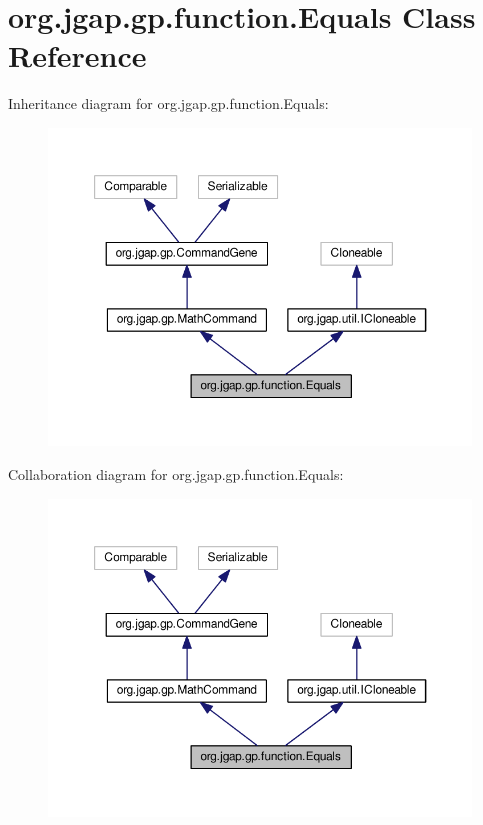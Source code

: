 \hypertarget{classorg_1_1jgap_1_1gp_1_1function_1_1_equals}{\section{org.\-jgap.\-gp.\-function.\-Equals Class Reference}
\label{classorg_1_1jgap_1_1gp_1_1function_1_1_equals}
}


Inheritance diagram for org.\-jgap.\-gp.\-function.\-Equals\-:
\nopagebreak
\begin{figure}[H]
\begin{center}
\leavevmode
\includegraphics[width=350pt]{classorg_1_1jgap_1_1gp_1_1function_1_1_equals__inherit__graph}
\end{center}
\end{figure}


Collaboration diagram for org.\-jgap.\-gp.\-function.\-Equals\-:
\nopagebreak
\begin{figure}[H]
\begin{center}
\leavevmode
\includegraphics[width=350pt]{classorg_1_1jgap_1_1gp_1_1function_1_1_equals__coll__graph}
\end{center}
\end{figure}
